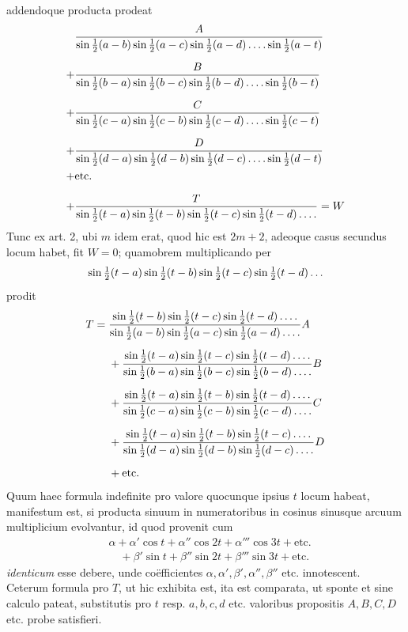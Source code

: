 addendoque producta prodeat
\[
\begin{aligned}
&\frac{A}{\sin\tfrac12(a-b)\sin\tfrac12(a-c)\sin\tfrac12(a-d)\mathinner{.\,.\,.\,.}\sin\tfrac12(a-t)}\\[6pt]
+{}&\frac{B}{\sin\tfrac12(b-a)\sin\tfrac12(b-c)\sin\tfrac12(b-d)\mathinner{.\,.\,.\,.}\sin\tfrac12(b-t)}\\[6pt]
+{}&\frac{C}{\sin\tfrac12(c-a)\sin\tfrac12(c-b)\sin\tfrac12(c-d)\mathinner{.\,.\,.\,.}\sin\tfrac12(c-t)}\\[6pt]
+{}&\frac{D}{\sin\tfrac12(d-a)\sin\tfrac12(d-b)\sin\tfrac12(d-c)\mathinner{.\,.\,.\,.}\sin\tfrac12(d-t)}\\
+{}&\text{etc.}\\[6pt]
+{}&\frac{T}{\sin\tfrac12(t-a)\sin\tfrac12(t-b)\sin\tfrac12(t-c)\sin\tfrac12(t-d)\mathinner{.\,.\,.\,.}}=W
\end{aligned}
\]
Tunc ex art. 2, ubi $m$ idem erat, quod hic est $2m+2$, adeoque casus secundus locum habet, fit $W=0$; quamobrem multiplicando per
\[
\sin\tfrac12(t-a)\sin\tfrac12(t-b)\sin\tfrac12(t-c)\sin\tfrac12(t-d)\mathinner{.\,.\,.}
\]
prodit
\[
\begin{aligned}
T={}&\frac{\sin\tfrac12(t-b)\sin\tfrac12(t-c)\sin\tfrac12(t-d)\mathinner{.\,.\,.\,.}}
{\sin\tfrac12(a-b)\sin\tfrac12(a-c)\sin\tfrac12(a-d)\mathinner{.\,.\,.\,.}}A\\[5pt]
&+\frac{\sin\tfrac12(t-a)\sin\tfrac12(t-c)\sin\tfrac12(t-d)\mathinner{.\,.\,.\,.}}
{\sin\tfrac12(b-a)\sin\tfrac12(b-c)\sin\tfrac12(b-d)\mathinner{.\,.\,.\,.}}B\\[5pt]
&+\frac{\sin\tfrac12(t-a)\sin\tfrac12(t-b)\sin\tfrac12(t-d)\mathinner{.\,.\,.\,.}}
{\sin\tfrac12(c-a)\sin\tfrac12(c-b)\sin\tfrac12(c-d)\mathinner{.\,.\,.\,.}}C\\[5pt]
&+\frac{\sin\tfrac12(t-a)\sin\tfrac12(t-b)\sin\tfrac12(t-c)\mathinner{.\,.\,.\,.}}
{\sin\tfrac12(d-a)\sin\tfrac12(d-b)\sin\tfrac12(d-c)\mathinner{.\,.\,.\,.}}D\\[5pt]
&+\text{etc.}
\end{aligned}
\]
Quum haec formula indefinite pro valore quocunque ipsius $t$ locum habeat, manifestum est, si producta sinuum in numeratoribus in cosinus sinusque arcuum
multiplicium evolvantur, id quod provenit cum
\[
\begin{aligned}
&\alpha+\alpha'\cos t+\alpha''\cos2t+\alpha'''\cos3t+\text{etc.}\\
&\quad+\beta'\sin t+\beta''\sin2t+\beta'''\sin3t+\text{etc.}
\end{aligned}
\]
\emph{identicum} esse debere, unde coëfficientes $\alpha,\alpha',\beta',\alpha'',\beta''$ etc. innotescent. Ceterum formula pro $T$, ut hic exhibita est, ita est comparata, ut sponte et sine calculo pateat, substitutis pro $t$ resp. $a,b,c,d$ etc. valoribus propositis $A,B,C,D$
etc. probe satisfieri.

